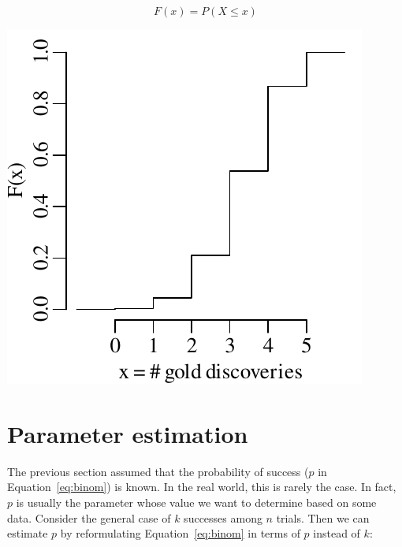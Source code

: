 \begin{equation}
  F(x) = P(X \leq x)
  \label{eq:CDF}
\end{equation}

\noindent\begin{minipage}[t][][b]{.3\textwidth}
  \includegraphics[width=\textwidth]{../figures/goldCDF.pdf}
\end{minipage}
\begin{minipage}[t][][t]{.7\textwidth}
  \label{fig:goldCDF}
\end{minipage}

\section{Parameter estimation}
\label{sec:binompar}

The previous section assumed that the probability of success ($p$ in
Equation~\ref{eq:binom}) is known.  In the real world, this is rarely
the case. In fact, $p$ is usually the parameter whose value we want to
determine based on some data. Consider the general case of $k$
successes among $n$ trials. Then we can estimate $p$ by reformulating
Equation~\ref{eq:binom} in terms of $p$ instead of $k$:

